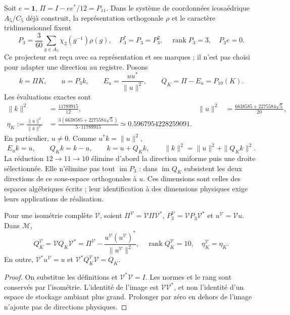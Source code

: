 Soit \(e=\mathbf1\), \(\Pi=I-ee^*/12=P_{11}\). Dans le système de coordonnées
icosaédrique \(A_5/C_5\) déjà construit, la représentation orthogonale
\(\rho\) et le caractère tridimensionnel fixent
\begin{equation}
 P_3=\frac3{60}\sum_{g\in A_5}\chi_3(g^{-1})\rho(g),
 \quad P_3^*=P_3=P_3^2,\quad
 \operatorname{rank}P_3=3,\quad P_3e=0.
 \label{lib01:P3}
\end{equation}
Ce projecteur est reçu avec sa représentation et ses marques ; il n’est pas choisi
pour adapter une direction au registre. Posons
\[
 k=\Pi K,\qquad u=P_3k,\qquad
 E_u=\frac{uu^*}{\|u\|^2},\qquad Q_K=\Pi-E_u=P_{10}(K).
\]
Les évaluations exactes sont
\begin{align}
 \|k\|^2&=\frac{11789915}{12},&
 \|u\|^2&=\frac{6638585+2275584\sqrt5}{20},
 \label{lib01:normas-direccion}\\
 \eta_K:=\frac{\|u\|^2}{\|k\|^2}
 &=\frac{3(6638585+2275584\sqrt5)}{5\cdot11789915}
 \simeq0.5967954228259091.
 \label{lib01:eta}
\end{align}
En particulier, \(u\ne0\). Comme \(u^*k=\|u\|^2\),
\begin{equation}
 E_uk=u,\qquad Q_Kk=k-u,\qquad
 k=u+Q_Kk,\qquad \|k\|^2=\|u\|^2+\|Q_Kk\|^2.
 \label{lib01:particion-direccion}
\end{equation}
La réduction \(12\to11\to10\) élimine d’abord la direction uniforme
puis une droite sélectionnée. Elle n’élimine pas tout \(\operatorname{im}P_3\) :
dans \(\operatorname{im}Q_K\) subsistent les deux directions de ce
sous-espace orthogonales à \(u\). Ces dimensions sont celles des
espaces algébriques écrits ; leur identification à des dimensions physiques
exige leurs applications de réalisation.

\begin{proposition}
\label{lib01:transporte-direccion}
Pour une isométrie complète \(\mathcal V\), soient
\(\Pi^{\mathcal V}=\mathcal V\Pi\mathcal V^*\),
\(P_3^{\mathcal V}=\mathcal VP_3\mathcal V^*\) et
\(u^{\mathcal V}=\mathcal Vu\). Dans \(\mathcal M\),
\[
 Q_K^{\mathcal V}
 =\mathcal VQ_K\mathcal V^*
 =\Pi^{\mathcal V}
 -\frac{u^{\mathcal V}(u^{\mathcal V})^*}{\|u^{\mathcal V}\|^2},
 \quad \operatorname{rank}Q_K^{\mathcal V}=10,
 \quad \eta_K^{\mathcal V}=\eta_K.
\]
En outre, \(\mathcal V^*u^{\mathcal V}=u\) et \(\mathcal V^*Q_K^{\mathcal V}\mathcal V=Q_K\).
\end{proposition}
\begin{proof}
On substitue les définitions et \(\mathcal V^*\mathcal V=I\). Les normes et le rang sont conservés par l'isométrie. L'identité de l'image est \(\mathcal V\mathcal V^*\), et non l'identité d'un espace de stockage ambiant plus grand. Prolonger par zéro en dehors de l'image n'ajoute pas de directions physiques.
\end{proof}

